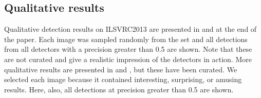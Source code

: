 \subsection{Qualitative results}
Qualitative detection results on ILSVRC2013 are presented in  and  at the end of the paper.
Each image was sampled randomly from the \valb set and all detections from all detectors with a precision greater than 0.5 are shown.
Note that these are not curated and give a realistic impression of the detectors in action.
More qualitative results are presented in  and , but these have been curated.
We selected each image because it contained interesting, surprising, or amusing results.
Here, also, all detections at precision greater than 0.5 are shown.
